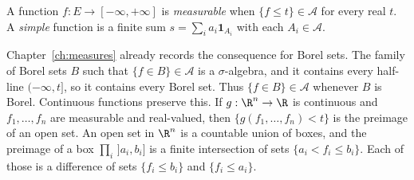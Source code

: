 \begin{definition}
A function \(f:E\to[-\infty,+\infty]\) is \emph{measurable} when \(\{f\le t\}\in\mathcal A\) for every real \(t\). A \emph{simple} function is a finite sum \(s=\sum_ia_i\mathbf 1_{A_i}\) with each \(A_i\in\mathcal A\).
\end{definition}

Chapter~\ref{ch:measures} already records the consequence for Borel sets. The family of Borel sets \(B\) such that \(\{f\in B\}\in\mathcal A\) is a \(\sigma\)-algebra, and it contains every half-line \((-\infty,t]\), so it contains every Borel set. Thus \(\{f\in B\}\in\mathcal A\) whenever \(B\) is Borel. Continuous functions preserve this. If \(g:\R^n\to\R\) is continuous and \(f_1,\dots,f_n\) are measurable and real-valued, then \(\{g(f_1,\dots,f_n)<t\}\) is the preimage of an open set. An open set in \(\R^n\) is a countable union of boxes, and the preimage of a box \(\prod_i\,]a_i,b_i]\) is a finite intersection of sets \(\{a_i<f_i\le b_i\}\). Each of those is a difference of sets \(\{f_i\le b_i\}\) and \(\{f_i\le a_i\}\).

